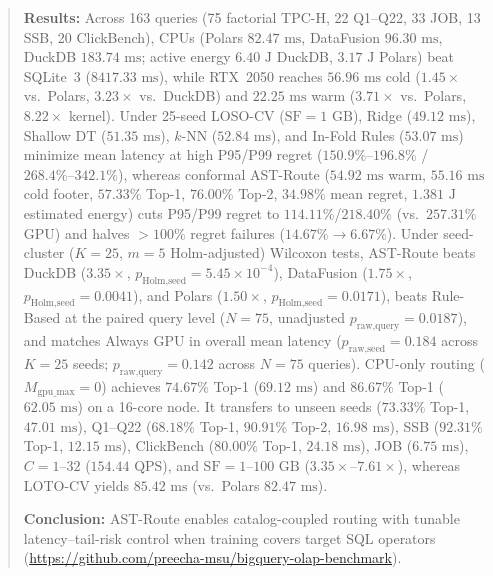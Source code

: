 \documentclass[10pt,a4paper]{article}
\begin{document}
\begin{quote}
\textbf{Results:} Across 163 queries (75 factorial TPC-H, 22 Q1--Q22, 33 JOB, 13 SSB, 20 ClickBench), CPUs (Polars $82.47\text{ ms}$, DataFusion $96.30\text{ ms}$, DuckDB $183.74\text{ ms}$; active energy $6.40\text{ J}$ DuckDB, $3.17\text{ J}$ Polars) beat SQLite~3 ($8417.33\text{ ms}$), while RTX~2050 reaches $56.96\text{ ms}$ cold ($1.45\times$ vs.\ Polars, $3.23\times$ vs.\ DuckDB) and $22.25\text{ ms}$ warm ($3.71\times$ vs.\ Polars, $8.22\times$ kernel). Under 25-seed LOSO-CV ($\text{SF}=1\text{ GB}$), Ridge ($49.12\text{ ms}$), Shallow DT ($51.35\text{ ms}$), $k$-NN ($52.84\text{ ms}$), and In-Fold Rules ($53.07\text{ ms}$) minimize mean latency at high P95/P99 regret ($150.9\%\text{--}196.8\%$ / $268.4\%\text{--}342.1\%$), whereas conformal AST-Route ($54.92\text{ ms}$ warm, $55.16\text{ ms}$ cold footer, $57.33\%$ Top-1, $76.00\%$ Top-2, $34.98\%$ mean regret, $1.381\text{ J}$ estimated energy) cuts P95/P99 regret to $114.11\%$/$218.40\%$ (vs.\ $257.31\%$ GPU) and halves $>100\%$ regret failures ($14.67\%\rightarrow 6.67\%$). Under seed-cluster ($K=25$, $m=5$ Holm-adjusted) Wilcoxon tests, AST-Route beats DuckDB ($3.35\times$, $p_{\text{Holm,seed}}=5.45\times 10^{-4}$), DataFusion ($1.75\times$, $p_{\text{Holm,seed}}=0.0041$), and Polars ($1.50\times$, $p_{\text{Holm,seed}}=0.0171$), beats Rule-Based at the paired query level ($N=75$, unadjusted $p_{\text{raw,query}}=0.0187$), and matches Always GPU in overall mean latency ($p_{\text{raw,seed}}=0.184$ across $K=25$ seeds; $p_{\text{raw,query}}=0.142$ across $N=75$ queries). CPU-only routing ($M_{\text{gpu\_max}}=0$) achieves $74.67\%$ Top-1 ($69.12\text{ ms}$) and $86.67\%$ Top-1 ($62.05\text{ ms}$) on a 16-core node. It transfers to unseen seeds ($73.33\%$ Top-1, $47.01\text{ ms}$), Q1--Q22 ($68.18\%$ Top-1, $90.91\%$ Top-2, $16.98\text{ ms}$), SSB ($92.31\%$ Top-1, $12.15\text{ ms}$), ClickBench ($80.00\%$ Top-1, $24.18\text{ ms}$), JOB ($6.75\text{ ms}$), $C=1\text{--}32$ ($154.44\text{ QPS}$), and $\text{SF}=1\text{--}100\text{ GB}$ ($3.35\times\text{--}7.61\times$), whereas LOTO-CV yields $85.42\text{ ms}$ (vs.\ Polars $82.47\text{ ms}$).

\textbf{Conclusion:} AST-Route enables catalog-coupled routing with tunable latency--tail-risk control when training covers target SQL operators (\url{https://github.com/preecha-msu/bigquery-olap-benchmark}).
\end{quote}
\end{document}
